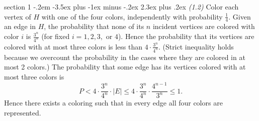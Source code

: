 \documentclass[12pt]{article}
\makeatletter
\theoremstyle{norm}
\newcommand{\rc}[1]{\frac{1}{#1}}
\newenvironment{problem}{\@startsection
       {section}
       {1}
       {-.2em}
       {-3.5ex plus -1ex minus -.2ex}
       {2.3ex plus .2ex}
       {\pagebreak[3]%
       \large\bf\noindent{Problem }
       }
       }
       {%
       }
\makeatother
\begin{document}
\begin{problem}{\it (1.2)}
Color each vertex of $H$ with one of the four colors, independently with probability $\rc 4$. Given an edge in $H$, the probability that none of its $n$ incident vertices are colored with color $i$ is $\frac{3^n}{4^n}$ (for fixed $i=1,2,3,$ or $4$). Hence the probability that its vertices are colored with at most three colors is less than $4\cdot \frac {3^n}{4^n}$. (Strict inequality holds because we overcount the probability in the cases where they are colored in at most 2 colors.) The probability that some edge has its vertices colored with at most three colors is
\[
P< 4\cdot \frac {3^n}{4^n}\cdot |E|\leq 4\cdot \frac{3^n}{4^n}\cdot \frac{4^{n-1}}{3^n}\leq 1.
\]
Hence there exists a coloring such that in every edge all four colors are represented.
\end{problem}
\end{document}
